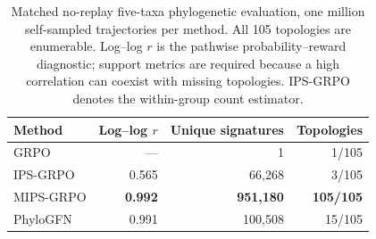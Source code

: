 \begin{table}[htbp]
\centering
\caption{Matched no-replay five-taxa phylogenetic evaluation, one million
self-sampled trajectories per method. All 105 topologies are enumerable.
Log--log \(r\) is the pathwise probability--reward diagnostic; support metrics
are required because a high correlation can coexist with missing topologies.
IPS-GRPO denotes the within-group count estimator.}
\label{tab:phylo-main}
\begin{tabular}{lrrr}
\toprule
Method & Log--log \(r\) & Unique signatures & Topologies \\
\midrule
GRPO & --- & 1 & 1/105 \\
IPS-GRPO & 0.565 & 66,268 & 3/105 \\
MIPS-GRPO & \textbf{0.992} & \textbf{951,180} & \textbf{105/105} \\
PhyloGFN & 0.991 & 100,508 & 15/105 \\
\bottomrule
\end{tabular}
\end{table}

